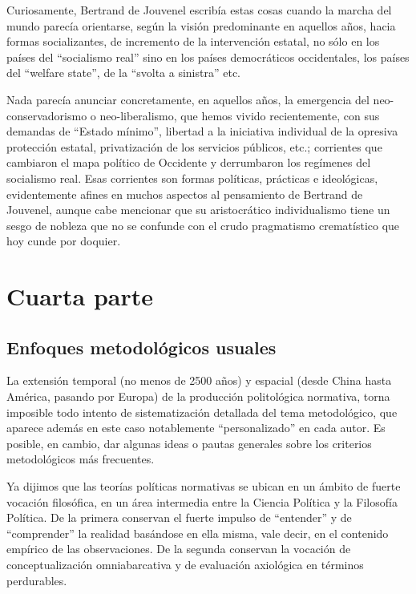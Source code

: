 \documentclass[
]{book}
\begin{document}
Curiosamente, Bertrand de Jouvenel escribía estas cosas cuando la marcha del mundo parecía orientarse, según la visión predominante en aquellos años, hacia formas socializantes, de incremento de la intervención estatal, no sólo en los países del ``socialismo real'' sino en los países democráticos occidentales, los países del ``welfare state'', de la ``svolta a sinistra'' etc.

Nada parecía anunciar concretamente, en aquellos años, la emergencia del neo-conservadorismo o neo-liberalismo, que hemos vivido recientemente, con sus demandas de ``Estado mínimo'', libertad a la iniciativa individual de la opresiva protección estatal, privatización de los servicios públicos, etc.; corrientes que cambiaron el mapa político de Occidente y derrumbaron los regímenes del socialismo real. Esas corrientes son formas políticas, prácticas e ideológicas, evidentemente afines en muchos aspectos al pensamiento de Bertrand de Jouvenel, aunque cabe mencionar que su aristocrático individualismo tiene un sesgo de nobleza que no se confunde con el crudo pragmatismo crematístico que hoy cunde por doquier.

\hypertarget{cuarta-parte}{%
\section*{Cuarta parte}\label{cuarta-parte}}

\hypertarget{enfoques-metodoluxf3gicos-usuales}{%
\subsection*{Enfoques metodológicos usuales}\label{enfoques-metodoluxf3gicos-usuales}}

La extensión temporal (no menos de 2500 años) y espacial (desde China hasta América, pasando por Europa) de la producción politológica normativa, torna imposible todo intento de sistematización detallada del tema metodológico, que aparece además en este caso notablemente ``personalizado'' en cada autor. Es posible, en cambio, dar algunas ideas o pautas generales sobre los criterios metodológicos más frecuentes.

Ya dijimos que las teorías políticas normativas se ubican en un ámbito de fuerte vocación filosófica, en un área intermedia entre la Ciencia Política y la Filosofía Política. De la primera conservan el fuerte impulso de ``entender'' y de ``comprender'' la realidad basándose en ella misma, vale decir, en el contenido empírico de las observaciones. De la segunda conservan la vocación de conceptualización omniabarcativa y de evaluación axiológica en términos perdurables.
\end{document}
